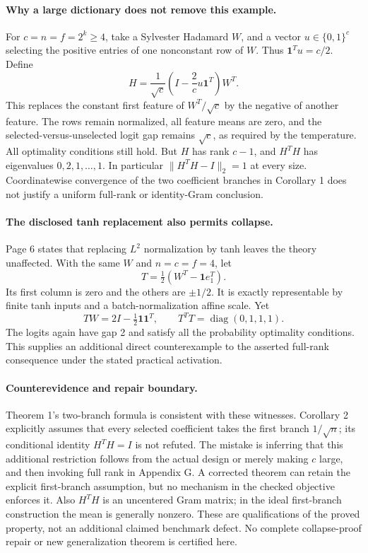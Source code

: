 \documentclass[10pt]{article}
\begin{document}
\paragraph*{Why a large dictionary does not remove this example.}\mbox{}\par
For \(c=n=f=2^k\geq4\), take a Sylvester Hadamard \(W\), and a vector \(u\in\{0,1\}^c\) selecting the positive entries of one nonconstant row of \(W\). Thus \(\mathbf1^Tu=c/2\). Define \[H=\frac1{\sqrt c}\left(I-\frac2c u\mathbf1^T\right)W^T.\] This replaces the constant first feature of \(W^T/\sqrt c\) by the negative of another feature. The rows remain normalized, all feature means are zero, and the selected-versus-unselected logit gap remains \(\sqrt c\), as required by the temperature. All optimality conditions still hold. But \(H\) has rank \(c-1\), and \(H^TH\) has eigenvalues \(0,2,1,\ldots,1\). In particular \(\|H^TH-I\|_2=1\) at every size. Coordinatewise convergence of the two coefficient branches in Corollary 1 does not justify a uniform full-rank or identity-Gram conclusion.\par
\paragraph*{The disclosed tanh replacement also permits collapse.}\mbox{}\par
Page 6 states that replacing \(L^2\) normalization by tanh leaves the theory unaffected. With the same \(W\) and \(n=c=f=4\), let \[T=\tfrac12(W^T-\mathbf1 e_1^T).\] Its first column is zero and the others are \(\pm1/2\). It is exactly representable by finite tanh inputs and a batch-normalization affine scale. Yet \[TW=2I-\tfrac12\mathbf1\mathbf1^T,\qquad
 T^TT=\operatorname{diag}(0,1,1,1).\] The logits again have gap 2 and satisfy all the probability optimality conditions. This supplies an additional direct counterexample to the asserted full-rank consequence under the stated practical activation.\par
\paragraph*{Counterevidence and repair boundary.}\mbox{}\par
Theorem 1’s two-branch formula is consistent with these witnesses. Corollary 2 explicitly assumes that every selected coefficient takes the first branch \(1/\sqrt n\); its conditional identity \(H^TH=I\) is not refuted. The mistake is inferring that this additional restriction follows from the actual design or merely making \(c\) large, and then invoking full rank in Appendix G. A corrected theorem can retain the explicit first-branch assumption, but no mechanism in the checked objective enforces it. Also \(H^TH\) is an uncentered Gram matrix; in the ideal first-branch construction the mean is generally nonzero. These are qualifications of the proved property, not an additional claimed benchmark defect. No complete collapse-proof repair or new generalization theorem is certified here.\par
\end{document}
